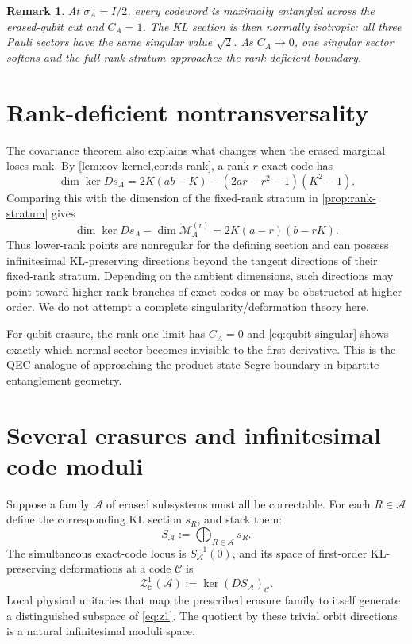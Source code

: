 \documentclass[11pt]{article}
\newtheorem{remark}[theorem]{Remark}
\theoremstyle{definition}
\newcommand{\cC}{\mathcal C}
\newcommand{\cM}{\mathcal M}
\newcommand{\1}{\mathbf 1}
\begin{document}
\begin{remark}
At $\sigma_A=I/2$, every codeword is maximally entangled across the erased-qubit cut and $C_A=1$.  The KL section is then normally isotropic: all three Pauli sectors have the same singular value $\sqrt2$.  As $C_A\to0$, one singular sector softens and the full-rank stratum approaches the rank-deficient boundary.
\end{remark}

\section{Rank-deficient nontransversality}
\label{sec:rank-deficient}

The covariance theorem also explains what changes when the erased marginal loses rank.  By \cref{lem:cov-kernel,cor:ds-rank}, a rank-$r$ exact code has
\begin{equation}
\dim\ker Ds_A
=
2K(ab-K)-(2ar-r^2-1)(K^2-1).
\label{eq:kernel-dim-r}
\end{equation}
Comparing this with the dimension of the fixed-rank stratum in \cref{prop:rank-stratum} gives
\begin{equation}
\boxed{
\dim\ker Ds_A-\dim\cM_A^{(r)}
=2K(a-r)(b-rK).
}
\label{eq:excess-linearized}
\end{equation}
Thus lower-rank points are nonregular for the defining section and can possess infinitesimal KL-preserving directions beyond the tangent directions of their fixed-rank stratum.  Depending on the ambient dimensions, such directions may point toward higher-rank branches of exact codes or may be obstructed at higher order.  We do not attempt a complete singularity/deformation theory here.

For qubit erasure, the rank-one limit has $C_A=0$ and \eqref{eq:qubit-singular} shows exactly which normal sector becomes invisible to the first derivative.  This is the QEC analogue of approaching the product-state Segre boundary in bipartite entanglement geometry.

\section{Several erasures and infinitesimal code moduli}
\label{sec:multi}

Suppose a family $\mathcal A$ of erased subsystems must all be correctable.  For each $R\in\mathcal A$ define the corresponding KL section $s_R$, and stack them:
\begin{equation}
S_{\mathcal A}:=\bigoplus_{R\in\mathcal A}s_R.
\label{eq:stacked-section}
\end{equation}
The simultaneous exact-code locus is $S_{\mathcal A}^{-1}(0)$, and its space of first-order KL-preserving deformations at a code $\cC$ is
\begin{equation}
\mathcal Z^1_{\cC}(\mathcal A):=\ker (DS_{\mathcal A})_{\cC}.
\label{eq:z1}
\end{equation}
Local physical unitaries that map the prescribed erasure family to itself generate a distinguished subspace of \eqref{eq:z1}.  The quotient by these trivial orbit directions is a natural infinitesimal moduli space.
\end{document}
